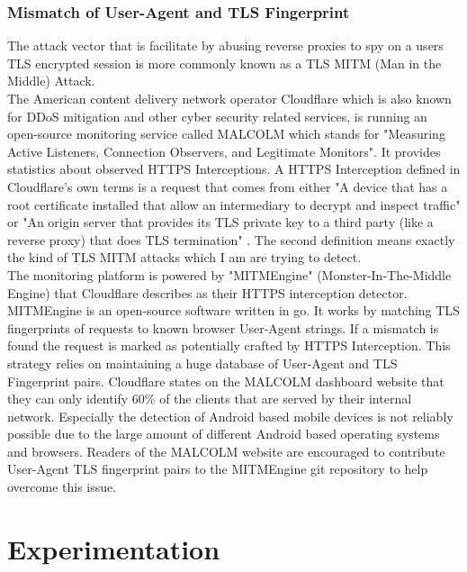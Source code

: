 \documentclass[12pt]{scrbook}
\begin{document}
\subsection{Mismatch of User-Agent and TLS Fingerprint}
The attack vector that is facilitate by abusing
reverse proxies to spy on a users TLS encrypted session is more commonly known
as a TLS MITM (Man in the Middle) Attack.\\The American content delivery
network operator Cloudflare which is also known for DDoS mitigation and other
cyber security related services, is running an open-source monitoring service
called MALCOLM which stands for "Measuring Active Listeners, Connection
Observers, and Legitimate Monitors". It provides statistics about observed
HTTPS Interceptions. A HTTPS Interception defined in Cloudflare's own terms is
a request that comes from either "A device that has a root certificate installed
that allow an intermediary to decrypt and inspect traffic" or "An origin
server that provides its TLS private key to a third party (like a reverse proxy)
that does TLS termination" \cite{cloudflareMALCOLM}. The second definition
means exactly the kind of TLS MITM attacks which I am are trying to detect.\\The
monitoring platform is powered by "MITMEngine" (Monster-In-The-Middle Engine)
that Cloudflare describes as their HTTPS interception detector. MITMEngine is
an open-source software written in go. It works by matching TLS fingerprints
of requests to known browser User-Agent strings. If a mismatch is found the
request is marked as potentially crafted by HTTPS Interception. This strategy
relies on maintaining a huge database of User-Agent and TLS Fingerprint
pairs. Cloudflare states on the MALCOLM dashboard website that they can only
identify 60\% of the clients that are served by their internal network.
Especially the detection of Android  based mobile devices is not reliably possible due
to the large amount of different Android based operating systems and browsers.
Readers of the MALCOLM website are encouraged to contribute User-Agent TLS
fingerprint pairs to the MITMEngine git repository to help overcome this issue.

\newpage
\chapter{Experimentation}
\end{document}
